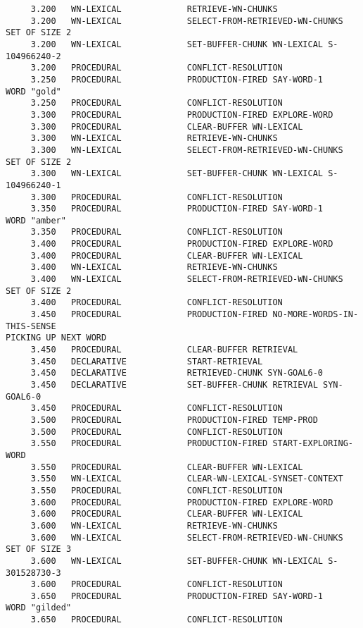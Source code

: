 \begin{verbatim}
     3.200   WN-LEXICAL             RETRIEVE-WN-CHUNKS 
     3.200   WN-LEXICAL             SELECT-FROM-RETRIEVED-WN-CHUNKS SET OF SIZE 2 
     3.200   WN-LEXICAL             SET-BUFFER-CHUNK WN-LEXICAL S-104966240-2 
     3.200   PROCEDURAL             CONFLICT-RESOLUTION 
     3.250   PROCEDURAL             PRODUCTION-FIRED SAY-WORD-1 
WORD "gold" 
     3.250   PROCEDURAL             CONFLICT-RESOLUTION 
     3.300   PROCEDURAL             PRODUCTION-FIRED EXPLORE-WORD 
     3.300   PROCEDURAL             CLEAR-BUFFER WN-LEXICAL 
     3.300   WN-LEXICAL             RETRIEVE-WN-CHUNKS 
     3.300   WN-LEXICAL             SELECT-FROM-RETRIEVED-WN-CHUNKS SET OF SIZE 2 
     3.300   WN-LEXICAL             SET-BUFFER-CHUNK WN-LEXICAL S-104966240-1 
     3.300   PROCEDURAL             CONFLICT-RESOLUTION 
     3.350   PROCEDURAL             PRODUCTION-FIRED SAY-WORD-1 
WORD "amber" 
     3.350   PROCEDURAL             CONFLICT-RESOLUTION 
     3.400   PROCEDURAL             PRODUCTION-FIRED EXPLORE-WORD 
     3.400   PROCEDURAL             CLEAR-BUFFER WN-LEXICAL 
     3.400   WN-LEXICAL             RETRIEVE-WN-CHUNKS 
     3.400   WN-LEXICAL             SELECT-FROM-RETRIEVED-WN-CHUNKS SET OF SIZE 2 
     3.400   PROCEDURAL             CONFLICT-RESOLUTION 
     3.450   PROCEDURAL             PRODUCTION-FIRED NO-MORE-WORDS-IN-THIS-SENSE 
PICKING UP NEXT WORD 
     3.450   PROCEDURAL             CLEAR-BUFFER RETRIEVAL 
     3.450   DECLARATIVE            START-RETRIEVAL 
     3.450   DECLARATIVE            RETRIEVED-CHUNK SYN-GOAL6-0 
     3.450   DECLARATIVE            SET-BUFFER-CHUNK RETRIEVAL SYN-GOAL6-0 
     3.450   PROCEDURAL             CONFLICT-RESOLUTION 
     3.500   PROCEDURAL             PRODUCTION-FIRED TEMP-PROD 
     3.500   PROCEDURAL             CONFLICT-RESOLUTION 
     3.550   PROCEDURAL             PRODUCTION-FIRED START-EXPLORING-WORD 
     3.550   PROCEDURAL             CLEAR-BUFFER WN-LEXICAL 
     3.550   WN-LEXICAL             CLEAR-WN-LEXICAL-SYNSET-CONTEXT 
     3.550   PROCEDURAL             CONFLICT-RESOLUTION 
     3.600   PROCEDURAL             PRODUCTION-FIRED EXPLORE-WORD 
     3.600   PROCEDURAL             CLEAR-BUFFER WN-LEXICAL 
     3.600   WN-LEXICAL             RETRIEVE-WN-CHUNKS 
     3.600   WN-LEXICAL             SELECT-FROM-RETRIEVED-WN-CHUNKS SET OF SIZE 3 
     3.600   WN-LEXICAL             SET-BUFFER-CHUNK WN-LEXICAL S-301528730-3 
     3.600   PROCEDURAL             CONFLICT-RESOLUTION 
     3.650   PROCEDURAL             PRODUCTION-FIRED SAY-WORD-1 
WORD "gilded" 
     3.650   PROCEDURAL             CONFLICT-RESOLUTION 

\end{verbatim}
